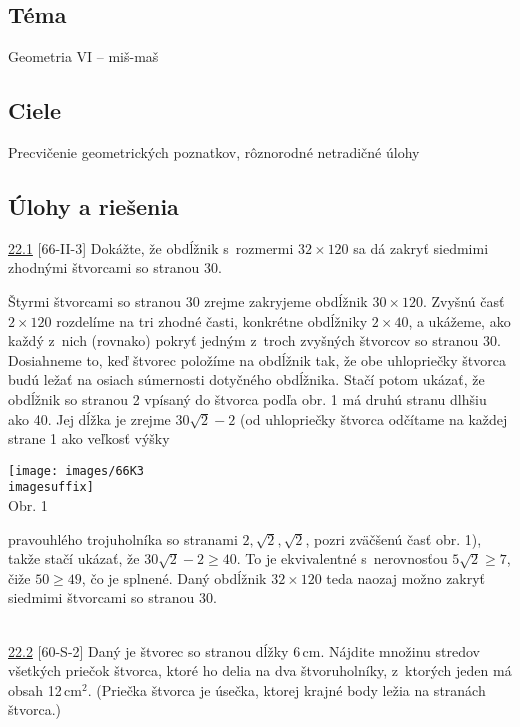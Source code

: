 
\subsection*{Téma}
Geometria VI -- miš-maš
\subsection*{Ciele}
Precvičenie geometrických poznatkov, rôznorodné netradičné úlohy

\subsection*{Úlohy a riešenia}
\begin{tcolorbox}[breakable,notitle,boxrule=0pt,colback=light-gray,colframe=light-gray]\ul{22.1} [66-II-3] Dokážte, že obdĺžnik s~rozmermi $32 \times 120$ sa dá zakryť siedmimi zhodnými štvorcami so stranou 30.

\end{tcolorbox}

\rieh Štyrmi štvorcami so stranou 30 zrejme zakryjeme obdĺžnik $30\times 120$. Zvyšnú časť $2 \times 120$ rozdelíme na tri zhodné časti, konkrétne obdĺžniky $2 \times 40$, a ukážeme, ako každý z~nich (rovnako) pokryť jedným z~troch zvyšných štvorcov so stranou 30. Dosiahneme to, keď štvorec položíme na obdĺžnik tak, že obe uhlopriečky štvorca budú ležať na osiach súmernosti dotyčného obdĺžnika. Stačí potom ukázať, že obdĺžnik so stranou 2 vpísaný do štvorca podľa obr. 1 má druhú stranu dlhšiu ako 40. Jej dĺžka je zrejme $30\sqrt{2}-2$ (od uhlopriečky štvorca odčítame na každej strane 1 ako veľkosť výšky
\begin{center}
\texttt{[image: images/66K3\\imagesuffix]} \\

Obr. 1
\end{center}
pravouhlého trojuholníka so stranami $2, \sqrt{2}, \sqrt{2}$, pozri zväčšenú časť obr. 1), takže stačí ukázať, že $30\sqrt{2}-2\geq 40$. To je ekvivalentné s~nerovnosťou $5\sqrt{2}\geq 7$, čiže $50 \geq 49$, čo je splnené. Daný obdĺžnik $32 \times 120$ teda naozaj možno zakryť siedmimi štvorcami so stranou 30.\\
\\
\begin{tcolorbox}[breakable,notitle,boxrule=0pt,colback=light-gray,colframe=light-gray]\ul{22.2} [60-S-2]  Daný je štvorec so stranou dĺžky 6\,cm. Nájdite množinu stredov všetkých priečok štvorca, ktoré ho delia na dva štvoruholníky, z~ktorých jeden má obsah 12\,cm$^2$. (Priečka štvorca je úsečka, ktorej krajné body ležia na stranách štvorca.)

\end{tcolorbox}

